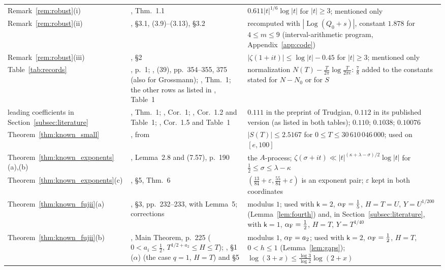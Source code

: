 \documentclass[11pt,a4paper]{article}
\makeatletter
\numberwithin{equation}{section}
\DeclareRobustCommand{\CGref}[1]{\ref{#1}}
\DeclareRobustCommand{\CGcite}[2][]{\if\relax\detokenize{#1}\relax\cite{#2}\else\cite[#1]{#2}\fi}
\let\CG@origref\ref
\newcommand{\CG@gettip}[1]{\@ifundefined{CGTip@#1}{#1}{\csname CGTip@#1\endcsname}}
\newcommand{\CG@getbib}[1]{\@ifundefined{CGBib@#1}{#1}{\csname CGBib@#1\endcsname}}
\DeclareRobustCommand{\CGref}[1]{\pdftooltip{\CG@origref{#1}}{\CG@gettip{#1}}}
\DeclareRobustCommand{\CGcite}[2][]{\pdftooltip{\if\relax\detokenize{#1}\relax\cite{#2}\else\cite[#1]{#2}\fi}{\CG@getbib{#2}}}
\theoremstyle{definition}
\theoremstyle{remark}
\newcommand{\Nz}{N_0} %
\makeatother
\begin{document}
\begin{center}
\begin{longtable}{p{}p{}p{}}
Remark~\CGref{rem:robust}(i) & \CGcite{Revers2026}, Thm.~1.1 & $0.611|t|^{1/6}\log|t|$ for $|t|\ge3$; mentioned only\\
Remark~\CGref{rem:robust}(ii) & \CGcite{Yang2024}, \S3.1, (3.9)--(3.13), \S3.2 & recomputed with $|\operatorname{Log}(Q_0+s)|$, constant $1.878$ for $4\le m\le9$ (interval-arithmetic program, Appendix~\CGref{app:code})\\
Remark~\CGref{rem:robust}(iii) & \CGcite{HiaryLeongYang2024}, \S2 & $|\zeta(1+it)|\le\log|t|-0.45$ for $|t|\ge3$; mentioned only\\
Table~\CGref{tab:records} & \CGcite{VonMangoldt1905}, p.~1; \CGcite{Backlund1918}, (39), pp.~354--355, 375 (also for Grossmann); \CGcite{Trudgian2012}, Thm.~1; the other rows as listed in \CGcite{BellottiWong2025}, Table~1 & normalization $N(T)-\frac T{2\pi}\log\frac T{2\pi e}$: $\frac78$ added to the constants stated for $N-\Nz$ or for $S$\\
leading coefficients in Section~\CGref{subsec:literature} & \CGcite{Trudgian2014}, Thm.~1; \CGcite{PlattTrudgian2015}, Cor.~1; \CGcite{HasanalizadeShenWong2022}, Cor.~1.2 and Table~1; \CGcite{BellottiWong2025}, Cor.~1.5 and Table~1 & $0.111$ in the preprint of Trudgian, $0.112$ in its published version (as listed in both tables); $0.110$; $0.1038$; $0.10076$\\
Theorem~\CGref{thm:known_small} & \CGcite[(1.2)]{BellottiWong2025}, from \CGcite{Platt2017} & $|S(T)|\le2.5167$ for $0\le T\le30\,610\,046\,000$; used on $[e,100]$\\
Theorem~\CGref{thm:known_exponents}(a),(b) & \CGcite{Ivic1985}, Lemma~2.8 and (7.57), p.~190 & the $A$-process; $\zeta(\sigma+it)\ll|t|^{(\kappa+\lambda-\sigma)/2}\log|t|$ for $\frac12\le\sigma\le\lambda-\kappa$\\
Theorem~\CGref{thm:known_exponents}(c) & \CGcite{Bourgain2017}, \S5, Thm.~6 & $(\frac{13}{84}+\varepsilon,\frac{55}{84}+\varepsilon)$ is an exponent pair; $\varepsilon$ kept in both coordinates\\
Theorem~\CGref{thm:known_fujii}(a) & \CGcite{Fujii1974}, \S3, pp.~232--233, with Lemma~5; corrections \CGcite[\S5]{Fujii1981} & modulus $1$; used with $\mathsf k=2$, $\alpha_{\rm F}=\frac15$, $H=T=U$, $Y=U^{1/200}$ (Lemma~\CGref{lem:fourth}) and, in Section~\CGref{subsec:literature}, with $\mathsf k=1$, $\alpha_{\rm F}=\frac12$, $H=T$, $Y=T^{1/40}$\\
Theorem~\CGref{thm:known_fujii}(b) & \CGcite{Fujii1974}, Main Theorem, p.~225 ($0<a_i\le\frac12$, $T^{1/2+a_2}\le H\le T$); \CGcite{Fujii1981}, \S1 ($\alpha$) (the case $q=1$, $H=T$) and \S5 & modulus $1$, $\alpha_{\rm F}=a_2$; used with $\mathsf k=2$, $\alpha_{\rm F}=\frac12$, $H=T$, $0<h\le1$ (Lemma~\CGref{lem:gaps}); $\log(3+x)\le\frac{\log3}{\log2}\log(2+x)$\\

\end{longtable}
\end{center}
\end{document}
